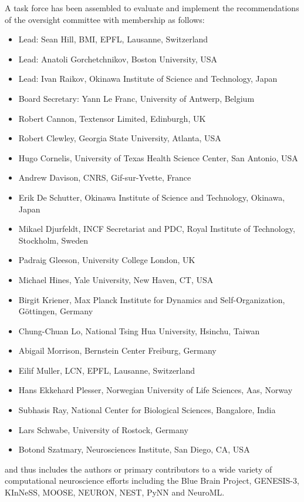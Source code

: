 \documentclass{article}
\begin{document}
A task force has been assembled to evaluate and implement the
recommendations of the oversight committee with membership as follows:

\begin{itemize}

    \item Lead: Sean Hill, BMI, EPFL, Lausanne, Switzerland
    \item Lead: Anatoli Gorchetchnikov, Boston University, USA
    \item Lead: Ivan Raikov, Okinawa Institute of Science and Technology, Japan
    \item Board Secretary: Yann Le Franc, University of Antwerp, Belgium
    \item Robert Cannon, Textensor Limited, Edinburgh, UK
    \item Robert Clewley, Georgia State University, Atlanta, USA
    \item Hugo Cornelis, University of Texas Health Science Center, San Antonio, USA
    \item Andrew Davison, CNRS, Gif-sur-Yvette, France
    \item Erik De Schutter, Okinawa Institute of Science and Technology, Okinawa, Japan
    \item Mikael Djurfeldt, INCF Secretariat and PDC,
Royal Institute of Technology, Stockholm, Sweden
    \item Padraig Gleeson, University College London, UK
    \item Michael Hines, Yale University, New Haven, CT, USA
    \item Birgit Kriener, Max Planck Institute for Dynamics and Self-Organization,
Göttingen, Germany

    \item Chung-Chuan Lo, National Tsing Hua University, Hsinchu, Taiwan
    \item Abigail Morrison, Bernstein Center Freiburg, Germany
    \item Eilif Muller, LCN, EPFL, Lausanne, Switzerland
    \item Hans Ekkehard Plesser, Norwegian University of Life Sciences, Aas, Norway
    \item Subhasis Ray, National Center for Biological Sciences, Bangalore, India
    \item Lars Schwabe, University of Rostock, Germany
    \item Botond Szatmary, Neurosciences Institute, San Diego, CA, USA

\end{itemize}

and thus includes the authors or primary contributors to a wide
variety of computational neuroscience efforts including the Blue Brain
Project, GENESIS-3, KInNeSS, MOOSE, NEURON, NEST, PyNN and NeuroML.



\end{document}
